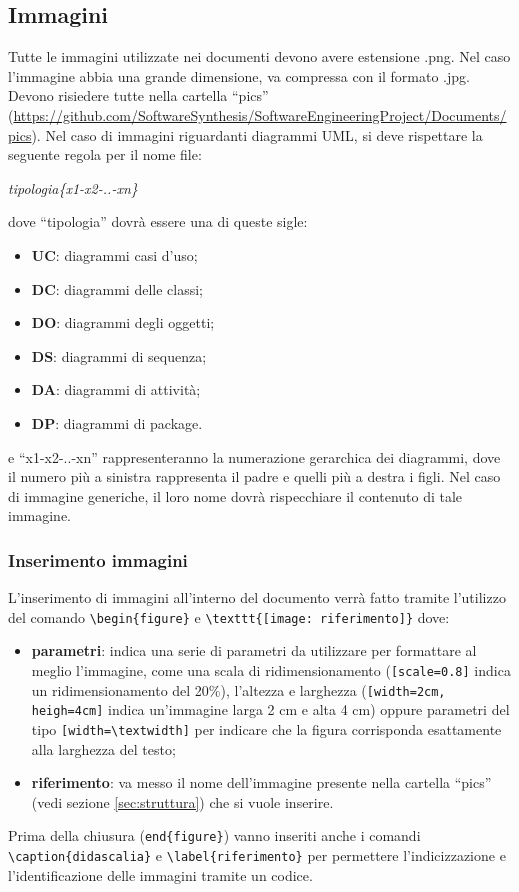 \subsection{Immagini}\label{image}
Tutte le immagini utilizzate nei documenti devono avere estensione .png. Nel caso l'immagine abbia una grande dimensione, va compressa con il formato .jpg. Devono risiedere tutte nella cartella ``pics'' (\url{https://github.com/SoftwareSynthesis/SoftwareEngineeringProject/Documents/pics}).
\newline
Nel caso di immagini riguardanti diagrammi UML, si deve rispettare la seguente regola per il nome file:
\begin{center}
\textit{tipologia\{x1-x2-..-xn\}}
\end{center}
dove ``tipologia'' dovrà essere una di queste sigle:
\begin{itemize}
\item \textbf{UC}: diagrammi casi d'uso;
\item \textbf{DC}: diagrammi delle classi;
\item \textbf{DO}: diagrammi degli oggetti;
\item \textbf{DS}: diagrammi di sequenza;
\item \textbf{DA}: diagrammi di attività;
\item \textbf{DP}: diagrammi di package.
\end{itemize}
e ``x1-x2-..-xn'' rappresenteranno la numerazione gerarchica dei diagrammi, dove il numero più a sinistra rappresenta il padre e quelli più a destra i figli.
\newline
Nel caso di immagine generiche, il loro nome dovrà rispecchiare il contenuto di tale immagine.

\subsubsection{Inserimento immagini}
L'inserimento di immagini all'interno del documento verrà fatto tramite l'utilizzo del comando \verb+\begin{figure}+ e \verb+\texttt{[image: riferimento]}+ dove:
\begin{itemize}
\item \textbf{parametri}: indica una serie di parametri da utilizzare per formattare al meglio l'immagine, come una scala di ridimensionamento (\verb+[scale=0.8]+ indica un ridimensionamento del 20\%), l'altezza e larghezza (\verb+[width=2cm, heigh=4cm]+ indica un'immagine larga 2 cm e alta 4 cm) oppure parametri del tipo \verb+[width=\textwidth]+ per indicare che la figura corrisponda esattamente alla larghezza del testo;
\item \textbf{riferimento}: va messo il nome dell'immagine presente nella cartella ``pics'' (vedi sezione \ref{sec:struttura}) che si vuole inserire.
\end{itemize}
Prima della chiusura (\verb+end{figure}+) vanno inseriti anche i comandi \verb+\caption{didascalia}+ e \verb+\label{riferimento}+ per permettere l'indicizzazione e l'identificazione delle immagini tramite un codice.

